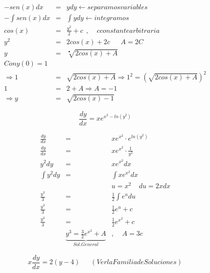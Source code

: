 \documentclass{article}
\begin{document}
\begin{eqnarray}
\nonumber -sen\left( x \right) dx &=& ydy \leftarrow separamos variables \\
\nonumber - \int sen\left( x \right) dx &=& \int ydy \leftarrow integramos \\
\nonumber cos \left( x \right) &=& \frac{y^2}{2} + c \ \ , \ \ \ \ \ c constante arbitraria \\
\nonumber y^2 &=& 2cos \left( x \right) + 2c \ \ \ \ \ \ \ A = 2C \\
\nonumber y &=&  \sqrt[•]{2cos \left( x \right) + A} \\
\nonumber Con y \left( 0 \right) = 1 \\
\nonumber  \Rightarrow 1 &=& \sqrt{2cos \left( x \right) + A} \Rightarrow 1^2 = \left( \sqrt{2cos \left( x \right) + A}\right)^2 \\
\nonumber 1 &=& 2 + A \Rightarrow A =-1 \\
\nonumber \Rightarrow  y &=& \sqrt{2cos\left(x \right) -1}
\end{eqnarray}


\begin{equation}
\frac{dy}{dx} = xe^{x^2 -ln\left( y^2 \right)}
\end{equation} 

\begin{eqnarray}
\nonumber \frac{dy}{dx} &=& xe^{x^2} \cdot e^{ln\left( y^2 \right)} \\
\nonumber \frac{dy}{dx} &=& xe^{x^2} \cdot \frac{1}{y^2} \\
\nonumber y^2dy &=& xe^{x^2}dx \\
\nonumber \int y^2dy &=& \int xe^{x^2}dx \\
\nonumber & & u = x^2 \ \ \ \ \  du = 2xdx\\
\nonumber \frac{y^3}{3} &=& \frac{1}{2} \int e^u du \\
\nonumber \frac{y^3}{3} &=& \frac{1}{2}e^u + c \\
\nonumber \frac{y^3}{3} &=& \frac{1}{2}e^{x^2} +c \\
\nonumber &\underbrace{y^3 = \frac{3}{2} e^{x^2} + A}_{Sol. General}& , \ \ \ \ \ A = 3c
\end{eqnarray} 


\begin{equation}
x \frac{dy}{dx} = 2 \left(y-4 \right) \ \ \ \ \ \ \ (Ver la Familia de Soluciones)
\end{equation}
\end{document}
